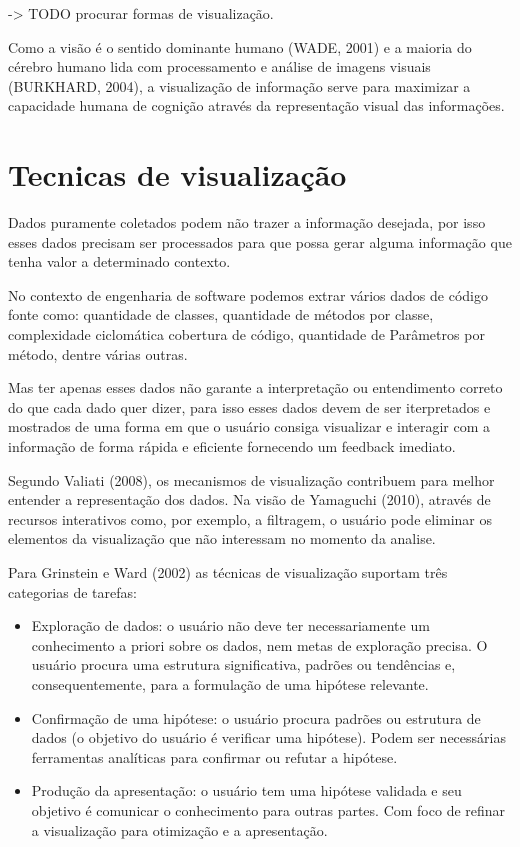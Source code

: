 -> TODO procurar  formas de visualização.

Como a visão é o sentido dominante humano (WADE, 2001) e a maioria do cérebro
humano lida com processamento e análise de imagens visuais (BURKHARD, 2004),
a visualização de informação serve para maximizar a capacidade humana de cognição
através da representação visual das informações.

\section{Tecnicas de visualização}

Dados puramente coletados podem não trazer a informação desejada, por isso esses
dados precisam ser processados para que possa gerar alguma informação que tenha
valor a determinado contexto.

No contexto de engenharia de software podemos extrar vários dados de código
fonte como: quantidade de classes, quantidade de métodos por classe,
complexidade ciclomática cobertura de código, quantidade de Parâmetros por
método, dentre várias outras.

Mas ter apenas esses dados não garante a interpretação ou entendimento correto
do que cada dado quer dizer, para isso esses dados devem de  ser
iterpretados e mostrados de uma forma em que o usuário consiga visualizar e
interagir com a informação de forma rápida e eficiente fornecendo um feedback
imediato.

Segundo Valiati (2008), os mecanismos de visualização contribuem para melhor
entender a representação dos dados. Na visão de Yamaguchi (2010), através de recursos
interativos como, por exemplo, a filtragem, o usuário pode eliminar os elementos da
visualização que não interessam no momento da analise.

Para Grinstein e Ward (2002) as técnicas de visualização suportam três categorias
de tarefas:

\begin{itemize}
  \item Exploração de dados: o usuário não deve ter necessariamente um
  conhecimento a priori sobre os dados, nem metas de exploração precisa. O
  usuário procura uma estrutura significativa, padrões ou tendências e,
  consequentemente, para a formulação de uma hipótese relevante.
  \item Confirmação de uma hipótese: o usuário procura padrões ou estrutura de
  dados (o objetivo do usuário é verificar uma hipótese). Podem ser necessárias
  ferramentas analíticas para confirmar ou refutar a hipótese.
  \item Produção da apresentação: o usuário tem uma hipótese validada e seu
  objetivo é comunicar o conhecimento para outras partes. Com foco de refinar
  a visualização para otimização e a apresentação.
\end{itemize}

